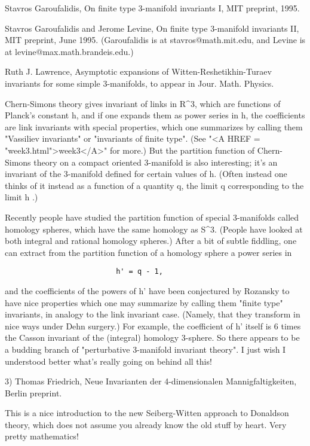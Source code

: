 Stavros Garoufalidis, On finite type 3-manifold invariants I, MIT preprint,
1995.

Stavros Garoufalidis and Jerome Levine, On finite type 3-manifold
invariants II, MIT preprint, June 1995.   (Garoufalidis is at 
stavros@math.mit.edu, and Levine is at levine@max.math.brandeis.edu.)

Ruth J. Lawrence, Asymptotic expansions of Witten-Reshetikhin-Turaev 
invariants for some simple 3-manifolds, to appear in Jour. Math. Physics.

Chern-Simons theory gives invariant of links in R^3, which are functions
of Planck's constant h, and if one expands them as power series in h,
the coefficients are link invariants with special properties, which one 
summarizes by calling them "Vassiliev invariants" or "invariants of 
finite type".  (See "<A HREF = "week3.html">week3</A>" for more.)   But the partition function of 
Chern-Simons theory on a compact oriented 3-manifold is also interesting; 
it's an invariant of the 3-manifold defined for certain values of h. 
(Often instead one thinks of it instead as a function of a quantity q, 
the limit q  corresponding to the limit h .)  

Recently people have studied the partition function of special 3-manifolds 
called homology spheres, which have the same homology as S^3.  (People have 
looked at both integral and rational homology spheres.)   After a bit of 
subtle fiddling, one can extract from the partition function of a homology 
sphere a power series in 

\begin{verbatim}
                          h' = q - 1,
\end{verbatim}
    

and the coefficients of the powers of h' have been conjectured by
Rozansky to have nice properties which one may summarize by calling them
"finite type" invariants, in analogy to the link invariant case.
(Namely, that they transform in nice ways under Dehn surgery.)  For
example, the coefficient of h' itself is 6 times the Casson invariant of
the (integral) homology 3-sphere.  So there appears to be a budding
branch of "perturbative 3-manifold invariant theory".  I just wish I
understood better what's really going on behind all this!

3) Thomas Friedrich, Neue Invarianten der 4-dimensionalen Mannigfaltigkeiten,
Berlin preprint.  

This is a nice introduction to the new Seiberg-Witten approach to Donaldson
theory, which does not assume you already know the old stuff by heart.  Very
pretty mathematics!


